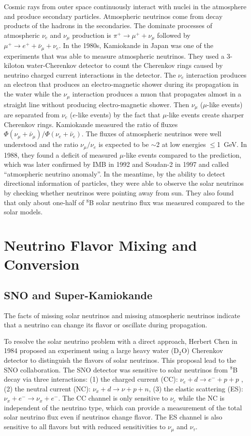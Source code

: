 \documentclass[preprint,12pt]{elsarticle}
\numberwithin{equation}{section}
\begin{document}
Cosmic rays from outer space continuously interact with nuclei in the atmosphere and produce secondary particles. Atmospheric neutrinos come from decay products of the hadrons in the secondaries. The dominate processes of atmospheric $\nu_e$ and $\nu_\mu$ production is $\pi^+\to\mu^+ + \nu_\mu$ followed by $\mu^+ \to e^+ + \bar{\nu}_\mu + \nu_e$. In the 1980s, Kamiokande in Japan was one of the experiments that was able to measure atmospheric neutrinos. They used a 3-kiloton water-Cherenkov detector to count the Cherenkov rings caused by neutrino charged current interactions in the detector. The $\nu_e$ interaction produces an electron that produces an electro-magnetic shower during its propagation in the water while the $\nu_\mu$ interaction produces a muon that propagates almost in a straight line without producing electro-magnetic shower. Then $\nu_\mu$ ($\mu$-like events) are separated from $\nu_e$ ($e$-like events) by the fact that $\mu$-like events create sharper Cherenkov rings. Kamiokande measured the ratio of fluxes $\Phi(\nu_\mu+\bar{\nu}_\mu)/\Phi(\nu_e+\bar{\nu}_e)$. The fluxes of atmospheric neutrinos were well understood and the ratio $\nu_\mu/\nu_e$ is expected to be $\sim$2 at low energies $\leq$1~GeV. In 1988, they found a deficit of measured $\mu$-like events compared to the prediction, which was later confirmed by IMB in 1992\cite{imb} and Soudan-2 in 1997\cite{soudan2} and called ``atmospheric neutrino anomaly''\cite{atmNuReview}. In the meantime, by the ability to detect directional information of particles, they were able to observe the solar neutrinos by checking whether neutrinos were pointing away from sun. They also found that only about one-half of $^8$B solar neutrino flux was measured compared to the solar models\cite{kamioII}. 

\section{Neutrino Flavor Mixing and Conversion}
\subsection{SNO and Super-Kamiokande}
The facts of missing solar neutrinos and missing atmospheric neutrinos indicate that a neutrino can change its flavor or oscillate during propagation.

To resolve the solar neutrino problem with a direct approach, Herbert Chen in 1984 proposed an experiment using a large heavy water (D$_2$O) Cherenkov detector to distinguish the flavors of solar neutrinos\cite{herbertChen}. This proposal lead to the SNO collaboration. The SNO detector was sensitive to solar neutrinos from $^8$B decay via three interactions: (1) the charged current (CC): $\nu_e+d\to e^-+p+p$ , (2) the neutral current (NC): $\nu_x+d\to\nu+p+n$, (3) the elastic scattering (ES): $\nu_x+e^-\to \nu_x+e^-$. The CC channel is only sensitive to $\nu_e$ while the NC is independent of the neutrino type, which can provide a measurement of the total solar neutrino flux even if neutrinos change flavor. The ES channel is also sensitive to all flavors but with reduced sensitivities to $\nu_\mu$ and $\nu_\tau$\cite{SNO}.
\end{document}
